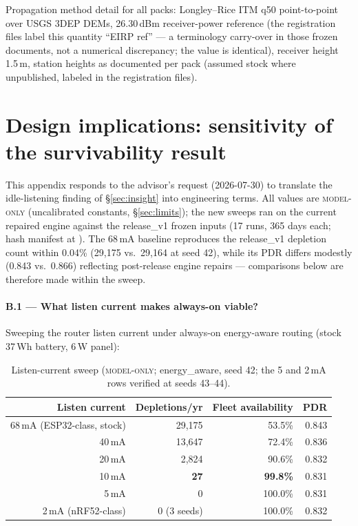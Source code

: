 \documentclass[11pt]{article}
\newcommand{\modelonly}{\textsc{model-only}}
\begin{document}
Propagation method detail for all packs: Longley--Rice ITM q50 point-to-point
over USGS 3DEP DEMs, 26.30\,dBm receiver-power reference (the registration files label this quantity ``EIRP ref'' --- a terminology carry-over in those frozen documents, not a numerical discrepancy; the value is identical), receiver height 1.5\,m, station heights as documented per pack (assumed stock where
unpublished, labeled in the registration files).


\section{Design implications: sensitivity of the survivability result}\label{app:design}

This appendix responds to the advisor's request (2026-07-30) to translate the
idle-listening finding of \S\ref{sec:insight} into engineering terms. All
values are \modelonly{} (uncalibrated constants, \S\ref{sec:limits}); the new
sweeps ran on the current repaired engine against the release\_v1 frozen
inputs (17 runs, 365 days each; hash manifest at
). The 68\,mA baseline reproduces the
release\_v1 depletion count within 0.04\% (29{,}175 vs.\ 29{,}164 at seed 42),
while its PDR differs modestly (0.843 vs.\ 0.866) reflecting post-release
engine repairs --- comparisons below are therefore made within the sweep.

\paragraph{B.1 --- What listen current makes always-on viable?}
Sweeping the router listen current under always-on energy-aware routing
(stock 37\,Wh battery, 6\,W panel):

\begin{table}[h]
\centering\small
\begin{tabular}{@{}rrrr@{}}
\toprule
Listen current & Depletions/yr & Fleet availability & PDR \\
\midrule
68\,mA (ESP32-class, stock) & 29{,}175 & 53.5\% & 0.843 \\
40\,mA & 13{,}647 & 72.4\% & 0.836 \\
20\,mA & 2{,}824  & 90.6\% & 0.832 \\
10\,mA & \textbf{27} & \textbf{99.8\%} & 0.831 \\
5\,mA  & 0 & 100.0\% & 0.831 \\
2\,mA (nRF52-class) & 0 (3 seeds) & 100.0\% & 0.832 \\
\bottomrule
\end{tabular}
\caption{Listen-current sweep (\modelonly; energy\_aware, seed 42; the 5 and
2\,mA rows verified at seeds 43--44).}
\end{table}
\end{document}
